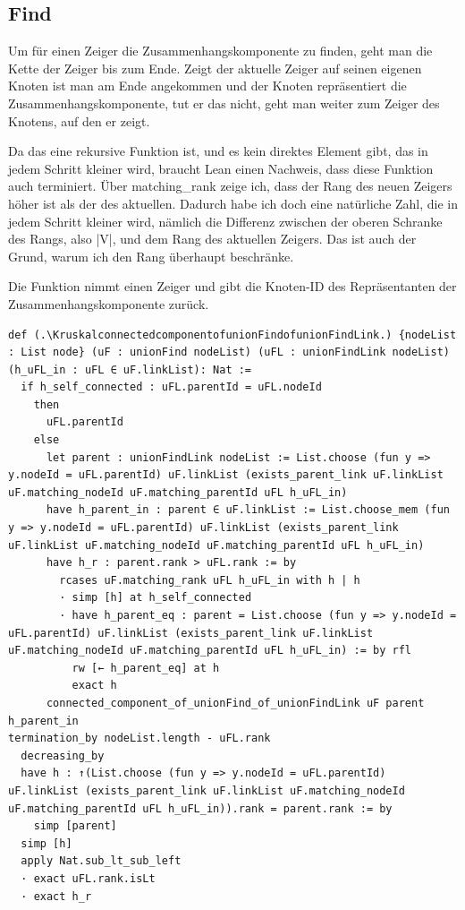 \subsection{Find}
Um für einen Zeiger die Zusammenhangskomponente zu finden, geht man die Kette der Zeiger bis zum Ende.
Zeigt der aktuelle Zeiger auf seinen eigenen Knoten ist man am Ende angekommen und der Knoten repräsentiert die Zusammenhangskomponente,
tut er das nicht, geht man weiter zum Zeiger des Knotens, auf den er zeigt.

Da das eine rekursive Funktion ist, und es kein direktes Element gibt, das in jedem Schritt kleiner wird, braucht Lean einen Nachweis, dass diese Funktion auch terminiert.
Über matching\_rank zeige ich, dass der Rang des neuen Zeigers höher ist als der des aktuellen.
Dadurch habe ich doch eine natürliche Zahl, die in jedem Schritt kleiner wird, nämlich die Differenz zwischen der oberen Schranke des Rangs, also |V|, und dem Rang des aktuellen Zeigers.
Das ist auch der Grund, warum ich den Rang überhaupt beschränke.

\begin{definition}[\KruskalconnectedcomponentofunionFindofunionFindLink]
  Die Funktion nimmt einen Zeiger und gibt die Knoten-ID des Repräsentanten der Zusammenhangskomponente zurück.
\end{definition}
\begin{lstlisting}
def (.\KruskalconnectedcomponentofunionFindofunionFindLink.) {nodeList : List node} (uF : unionFind nodeList) (uFL : unionFindLink nodeList) (h_uFL_in : uFL ∈ uF.linkList): Nat :=
  if h_self_connected : uFL.parentId = uFL.nodeId
    then
      uFL.parentId
    else
      let parent : unionFindLink nodeList := List.choose (fun y => y.nodeId = uFL.parentId) uF.linkList (exists_parent_link uF.linkList uF.matching_nodeId uF.matching_parentId uFL h_uFL_in)
      have h_parent_in : parent ∈ uF.linkList := List.choose_mem (fun y => y.nodeId = uFL.parentId) uF.linkList (exists_parent_link uF.linkList uF.matching_nodeId uF.matching_parentId uFL h_uFL_in)
      have h_r : parent.rank > uFL.rank := by
        rcases uF.matching_rank uFL h_uFL_in with h | h
        · simp [h] at h_self_connected
        · have h_parent_eq : parent = List.choose (fun y => y.nodeId = uFL.parentId) uF.linkList (exists_parent_link uF.linkList uF.matching_nodeId uF.matching_parentId uFL h_uFL_in) := by rfl
          rw [← h_parent_eq] at h
          exact h
      connected_component_of_unionFind_of_unionFindLink uF parent h_parent_in
termination_by nodeList.length - uFL.rank
  decreasing_by
  have h : ↑(List.choose (fun y => y.nodeId = uFL.parentId) uF.linkList (exists_parent_link uF.linkList uF.matching_nodeId uF.matching_parentId uFL h_uFL_in)).rank = parent.rank := by
    simp [parent]
  simp [h]
  apply Nat.sub_lt_sub_left
  · exact uFL.rank.isLt
  · exact h_r
\end{lstlisting}

